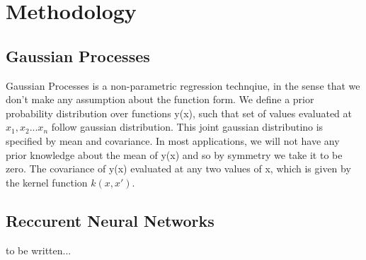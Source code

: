 \section{Methodology}
\subsection{Gaussian Processes}
Gaussian Processes is a non-parametric regression technqiue, in the sense that we don't make any assumption about the function form. We define a prior probability distribution over functions y(x), such that set of values evaluated at $x_1, x_2 ... x_n$ follow gaussian distribution. This joint gaussian distributino is specified by mean and covariance. In most applications, we will not have any
prior knowledge about the mean of y(x) and so by symmetry we take it to be zero. The covariance of y(x) evaluated at any two values of x,
which is given by the kernel function $k(x, x')$.
\subsection{Reccurent Neural Networks}
to be written...